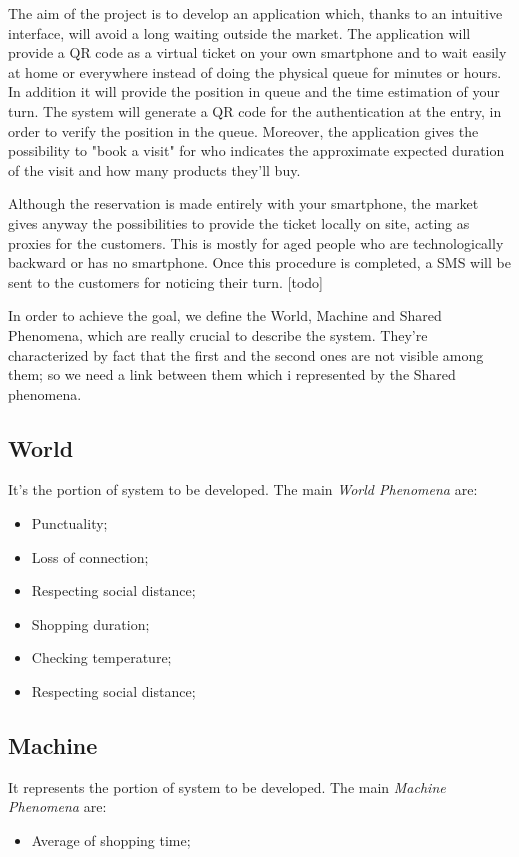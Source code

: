 The aim of the project is to develop an application which, thanks to an intuitive interface, will avoid a long waiting outside the market.
The application will provide a QR code as a virtual ticket on your own smartphone and to wait easily at home or everywhere instead of doing the physical queue for minutes or hours. 
In addition it will provide the position in queue and the time estimation of your turn.
The system will generate a QR code for the authentication at the entry, in order to verify the position in the queue. 
Moreover, the application gives the possibility to "book a visit" for who indicates the approximate expected duration of the visit and how many products they'll buy. \par \medskip
Although the reservation is made entirely with your smartphone, the market gives anyway the possibilities to provide the ticket locally on site, acting as proxies for the customers. This is mostly for aged people who are technologically backward or has no smartphone.
Once this procedure is completed, a SMS will be sent to the customers for noticing their turn. [todo]\par \medskip
In order to achieve the goal, we define the World, Machine and Shared Phenomena, which are really crucial to describe the system. They're characterized by fact that the first and the second ones are not visible among them; so we need a link between them which i represented by the Shared phenomena.






\subsection{World}
It's the portion of system to be developed. The main \textit{World Phenomena} are:

\begin{itemize}
\item Punctuality;
\item Loss of connection;
\item Respecting social distance;
\item Shopping duration;
\item Checking temperature;
\item Respecting social distance;
\end{itemize}

\subsection{Machine}
It represents the portion of system to be developed. The main \textit{Machine Phenomena} are:
\begin{itemize}
\item Average of shopping time;
\end{itemize}

